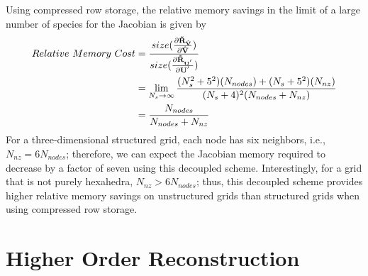 Using compressed row storage, the relative memory savings in the limit of a
large number of species for the Jacobian is given by
\begin{equation}
  \label{mem_req_eq}
  \begin{split} 
    Relative\ Memory\ Cost &=
    \frac{size(\frac{\partial \mathbf{\tilde{R}_{\mathbf{\hat{V}}}}}{\partial \mathbf{\hat{V}}})}{size(\frac{\partial \mathbf{\tilde{R}_{\mathbf{U}^{'}}}}{\partial \mathbf{U}^{'}})} \\ &= \lim_{N_s\to\infty}
    \frac{(N_s^2+5^2)(N_{nodes})+(N_s+5^2)(N_{nz})}{(N_s+4)^2(N_{nodes}+N_{nz})} \\
    &= \frac{N_{nodes}}{N_{nodes} + N_{nz}}
  \end{split}
\end{equation}
For a three-dimensional structured grid, each node has six neighbors,
i.e., $N_{nz} = 6N_{nodes}$; therefore, we can expect the Jacobian memory
required to decrease by a factor of seven using this decoupled scheme.
Interestingly, for a grid that is not purely hexahedra, $N_{nz} > 6N_{nodes}$;
thus, this decoupled scheme provides higher relative memory savings on
unstructured grids than structured grids when using compressed row storage.

\section{Higher Order Reconstruction}
\label{sec:2nd-order-reconstruction}

